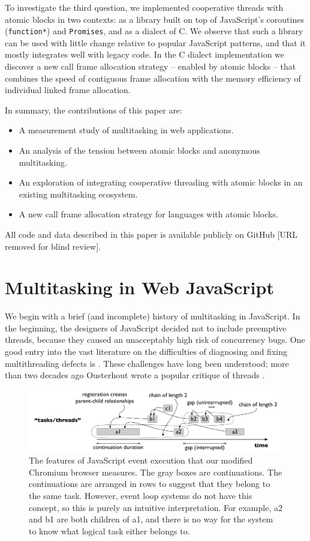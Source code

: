 \documentclass[acmsmall,anonymous,review]{acmart}\settopmatter{printfolios=true,printccs=false,printacmref=false}
\begin{document}
To investigate the third question, we implemented cooperative threads with atomic blocks in two contexts: as a library built on top of JavaScript's coroutines (\texttt{function*}) and \texttt{Promises}, and as a dialect of C.
We observe that such a library can be used with little change relative to popular JavaScript patterns, and that it mostly integrates well with legacy code.
In the C dialect implementation we discover a new call frame allocation strategy -- enabled by atomic blocks -- that combines the speed of contiguous frame allocation with the memory efficiency of individual linked frame allocation.

In summary, the contributions of this paper are:
\begin{itemize}
\item A measurement study of multitasking in web applications.
\item An analysis of the tension between atomic blocks and anonymous multitasking.
\item An exploration of integrating cooperative threading with atomic blocks in an existing multitasking ecosystem.
\item A new call frame allocation strategy for languages with atomic blocks.
\end{itemize}

All code and data described in this paper is available publicly on GitHub [URL removed for blind review].

\section{Multitasking in Web JavaScript}

We begin with a brief (and incomplete) history of multitasking in JavaScript.
In the beginning, the designers of JavaScript decided not to include preemptive threads, because they caused an unacceptably high risk of concurrency bugs.
One good entry into the vast literature on the difficulties of diagnosing and fixing multithreading defects is \cite{Lu2008}.
These challenges have long been understood; more than two decades ago Ousterhout wrote a popular critique of threads \cite{Ousterhout1996}.

\begin{figure}
\includegraphics[width=0.99\textwidth]{Figures/continuation_tree}
\caption{The features of JavaScript event execution that our modified Chromium browser measures.
  The gray boxes are continuations.
  The continuations are arranged in rows to suggest that they belong to the same task.
  However, event loop systems do not have this concept, so this is purely an intuitive interpretation.
  For example, \textsf{a2} and \textsf{b1} are both children of \textsf{a1}, and there is no way for the system to know what logical task either belongs to.}
\label{fig:continuation_tree}
\end{figure}
\end{document}
